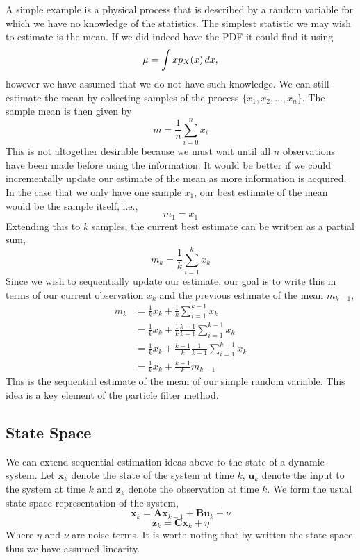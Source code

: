 \documentclass[11pt]{article}
\begin{document}
A simple example is a physical process that is described by a random variable
for which we have no knowledge of the statistics. The simplest statistic we may
wish to estimate is the mean. If we did indeed have the PDF it could find it
using
\begin{equation} \label{eq:someequation}
\mu = \int{xp_{X}(x)\textrm\,{d}x},
\end{equation}
however we have assumed that we do not have such knowledge. We can still
estimate the mean by collecting samples of the process $\{x_{1}, x_{2}, ... ,
x_{n}\}$. The sample mean is then given by
\begin{equation}
m = \frac{1}{n}\sum\limits_{i = 0}^{n}{x_{i}}
\end{equation}
This is not altogether desirable because we must wait until all $n$ observations
have been made before using the information. It would be better if we could
incrementally update our estimate of the mean as more information is acquired.
In the case that we only have one sample $x_{1}$, our best estimate of the mean
would be the sample itself, i.e.,
\begin{equation*}
m_{1} = x_{1}
\end{equation*}
Extending this to $k$ samples, the current best estimate can be written as a
partial sum,
\begin{equation}
m_{k} = \frac{1}{k}\sum\limits_{i = 1}^k{x_{k}}
\end{equation}
Since we wish to sequentially update our estimate, our goal is to write this
in terms of our current observation $x_{k}$ and the previous estimate of the
mean $m_{k-1}$,
\begin{align*}
m_{k} &= \frac{1}{k}x_{k} + \frac{1}{k}\sum\limits_{i = 1}^{k-1}{x_{k}} \\
&= \frac{1}{k}x_{k} + \frac{1}{k}\frac{k-1}{k-1}\sum\limits_{i=1}^{k-1}{x_{k}}
\\
&= \frac{1}{k}x_{k} + \frac{k-1}{k}\frac{1}{k-1}\sum\limits_{i=1}^{k-1}{x_{k}}
\\
&= \frac{1}{k}x_{k} + \frac{k-1}{k}m_{k-1}
\end{align*}
This is the sequential estimate of the mean of our simple random variable. This
idea is a key element of the particle filter method.

\subsection{State Space}
We can extend sequential estimation ideas above to the state of a dynamic
system. Let $\mathbf{x}_{k}$ denote the state of the system at time $k$,
$\mathbf{u}_{k}$ denote the input to the system at time $k$ and
$\mathbf{z}_{k}$ denote the observation at time $k$. We form the usual state
space representation of the system,
\begin{equation}
\mathbf{x}_{k} = \mathbf{A}\mathbf{x}_{k-1} + \mathbf{B}\mathbf{u}_{k} + \nu
\end{equation}
\begin{equation}
\mathbf{z}_{k} = \mathbf{C}\mathbf{x}_{k} + \eta
\end{equation}
Where $\eta$ and $\nu$ are noise terms. It is worth noting that by written the
state space thus we have assumed linearity.
\end{document}
